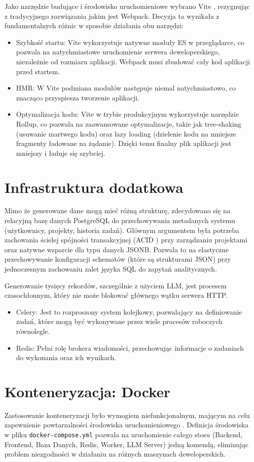 Jako narzędzie budujące i środowisko uruchomieniowe wybrano Vite \cite{vite}, rezygnując z tradycyjnego rozwiązania jakim jest Webpack. Decyzja ta wynikała z fundamentalnych różnic w sposobie działania obu narzędzi:
\begin{itemize}
    \item Szybkość startu: Vite wykorzystuje natywne moduły ES\cite{es_modules} w przeglądarce, co pozwala na natychmiastowe uruchomienie serwera deweloperskiego, niezależnie od rozmiaru aplikacji. Webpack musi zbudować cały kod aplikacji przed startem.
    \item \gls{HMR}: W Vite podmiana modułów następuje niemal natychmiastowo, co znacząco przyspiesza tworzenie aplikacji.
    \item Optymalizacja kodu: Vite w trybie produkcyjnym wykorzystuje narzędzie Rollup\cite{rollup}, co pozwala na zaawansowane optymalizacje, takie jak tree-shaking (usuwanie martwego kodu) oraz lazy loading (dzielenie kodu na mniejsze fragmenty ładowane na żądanie). Dzięki temu finalny plik aplikacji jest mniejszy i ładuje się szybciej.
\end{itemize}

\section*{Infrastruktura dodatkowa}
Mimo że generowane dane mogą mieć różną strukturę, zdecydowano się na relacyjną bazę danych PostgreSQL \cite{postgresql} do przechowywania metadanych systemu (użytkownicy, projekty, historia zadań).
Głównym argumentem była potrzeba zachowania ścisłej spójności transakcyjnej (ACID \cite{acid_transaction}) przy zarządzaniu projektami oraz natywne wsparcie dla typu danych JSONB. Pozwala to na elastyczne przechowywanie konfiguracji schematów (które są strukturami \gls{JSON}) przy jednoczesnym zachowaniu zalet języka \gls{SQL} do zapytań analitycznych.

Generowanie tysięcy rekordów, szczególnie z użyciem \gls{LLM}, jest procesem czasochłonnym, który nie może blokować głównego wątku serwera \gls{HTTP}.
\begin{itemize}
    \item Celery\cite{celery}: Jest to rozproszony system kolejkowy, pozwalający na definiowanie zadań, które mogą być wykonywane przez wiele procesów roboczych równolegle.
    \item Redis\cite{redis}: Pełni rolę brokera wiadomości, przechowując informacje o zadaniach do wykonania oraz ich wynikach.
\end{itemize}

\section*{Konteneryzacja: Docker}
Zastosowanie konteneryzacji było wymogiem niefunkcjonalnym, mającym na celu zapewnienie powtarzalności środowiska uruchomieniowego \cite{docker}. Definicja środowiska w pliku \texttt{docker-compose.yml} pozwala na uruchomienie całego stosu (Backend, Frontend, Baza Danych, Redis, Worker, \gls{LLM} Server) jedną komendą, eliminując problem niezgodności w działaniu na różnych maszynach deweloperskich.